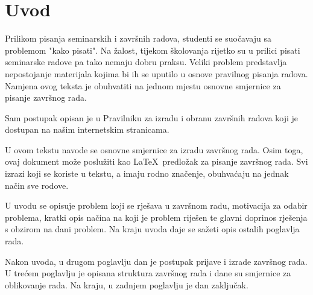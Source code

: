 \section{Uvod}
Prilikom pisanja seminarskih i završnih radova, studenti se suočavaju sa problemom "kako pisati". Na žalost, tijekom školovanja rijetko su u prilici pisati seminarske radove pa tako nemaju dobru praksu. Veliki problem predstavlja nepostojanje materijala kojima bi ih se uputilo u osnove pravilnog pisanja radova. Namjena ovog teksta 
je obuhvatiti na jednom 
mjestu osnovne smjernice za pisanje završnog rada.

Sam postupak opisan je u Pravilniku za izradu i obranu završnih radova koji je dostupan na našim internetskim stranicama.



U ovom tekstu navode se osnovne smjernice za izradu završnog rada. Osim toga, ovaj dokument može poslužiti kao \LaTeX \ predložak za pisanje završnog rada. Svi izrazi koji se koriste u tekstu, a imaju rodno značenje, obuhvaćaju na jednak način sve rodove. 

U uvodu se opisuje problem koji se rješava u završnom radu, motivacija za odabir problema, kratki opis načina na koji je problem riješen te glavni doprinos rješenja s obzirom na dani problem. Na kraju uvoda daje se sažeti opis ostalih poglavlja rada. 

Nakon uvoda, u drugom poglavlju dan je postupak prijave i izrade završnog rada. U trećem 
poglavlju je opisana struktura završnog rada i dane su smjernice za oblikovanje rada. Na kraju, u zadnjem poglavlju je dan zaključak.


 